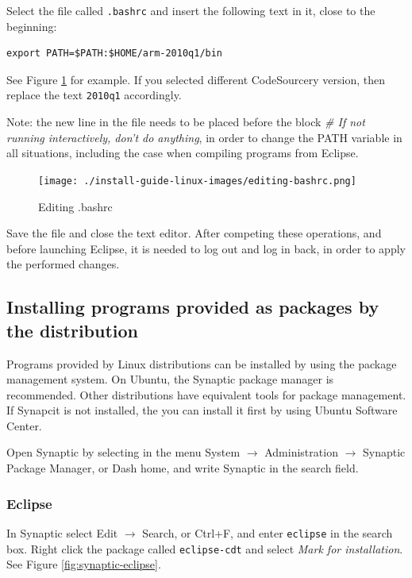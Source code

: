 \documentclass[a4paper, 10pt]{article}
\begin{document}
Select the file called \verb+.bashrc+ and insert the following text in it,
close to the beginning:

\begin{verbatim}
export PATH=$PATH:$HOME/arm-2010q1/bin
\end{verbatim}

See Figure \ref{fig:editing-bashrc} for example. If you selected different CodeSourcery version,
then replace the text \verb+2010q1+ accordingly.

Note: the new line in the file needs to be placed before the block
\emph{\# If not running interactively, don't do anything},
in order to change the PATH variable in all situations,
including the case when compiling programs from Eclipse.

    \begin{figure}[H]
    \centering
        \texttt{[image: ./install-guide-linux-images/editing-bashrc.png]}
        \caption{Editing .bashrc}
        \label{fig:editing-bashrc}
    \end{figure}

Save the file and close the text editor.
After competing these operations, and before launching Eclipse, it is needed to
log out and log in back, in order to apply the performed changes.

\subsection{Installing programs provided as packages by the distribution}

Programs provided by Linux distributions can be installed by using the package management system.
On Ubuntu, the Synaptic package manager is recommended.
Other distributions have equivalent tools for package management.
If Synapcit is not installed, the you can install it first by using
Ubuntu Software Center.

Open Synaptic by selecting in the menu System $\rightarrow$ Administration $\rightarrow$
Synaptic Package Manager,
or Dash home, and write Synaptic in the search field.

\subsubsection{Eclipse}

In Synaptic select Edit $\rightarrow$ Search, or Ctrl+F, and enter \verb+eclipse+
in the search box. Right click the package called
\verb+eclipse-cdt+ and select \emph{Mark for installation}.
See Figure \ref{fig:synaptic-eclipse}.
\end{document}
